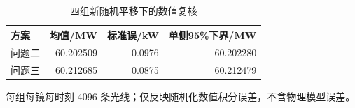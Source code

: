 \begin{table}[H]\centering\small
\caption{四组新随机平移下的数值复核}\label{tab:independent}
\begin{tabular}{lrrr}\toprule
方案 & 均值/MW & 标准误/kW & 单侧95\%下界/MW\\\midrule
问题二 & 60.202509 & 0.0976 & 60.202280\\
问题三 & 60.212685 & 0.0875 & 60.212479\\
\bottomrule\end{tabular}
\par\smallskip\begin{minipage}{.94\linewidth}\footnotesize 每组每镜每时刻 4096 条光线；仅反映随机化数值积分误差，不含物理模型误差。\end{minipage}
\end{table}
